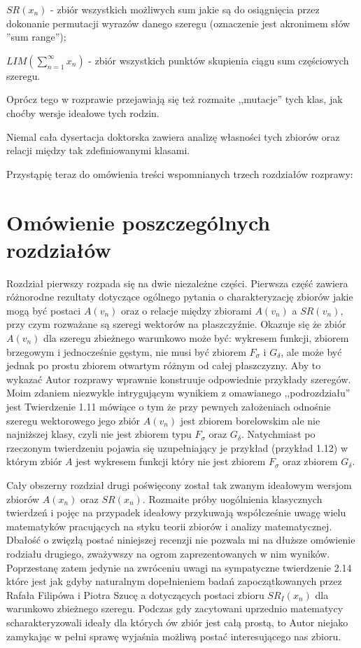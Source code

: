 \documentclass[12pt]{article}
\begin{document}
$SR(x_n)$ - zbiór wszystkich możliwych sum jakie są
do osiągnięcia przez dokonanie permutacji wyrazów
danego szeregu (oznaczenie jest akronimem słów 
''sum range'');

$LIM(\sum_{n=1}^\infty x_n)$ - zbiór wszystkich punktów
skupienia ciągu sum częściowych szeregu.

  Oprócz tego w rozprawie przejawiają się też rozmaite ,,mutacje''
tych klas, jak choćby wersje ideałowe tych rodzin.
  
  Niemal cała dysertacja doktorska zawiera analizę
własności tych zbiorów oraz relacji między tak zdefiniowanymi
klasami.
  

  Przystąpię teraz do omówienia treści wspomnianych trzech rozdziałów rozprawy:

\section{Omówienie poszczególnych rozdziałów}

Rozdział pierwszy rozpada się na dwie niezależne części.
Pierwsza część zawiera różnorodne rezultaty dotyczące ogólnego
pytania o charakteryzację zbiorów jakie mogą być postaci $A(v_n)$
oraz o relacje między zbiorami $A(v_n)$ a $SR(v_n)$, przy czym
rozważane są szeregi wektorów na płaszczyźnie.
Okazuje się że zbiór $A(v_n)$ dla szeregu zbieżnego warunkowo 
może być: wykresem funkcji,
zbiorem brzegowym i jednocześnie gęstym, nie musi być zbiorem
$F_\sigma$ i $G_\delta$, ale może być jednak po prostu zbiorem
otwartym różnym od całej płaszczyzny. Aby to wykazać Autor rozprawy 
wprawnie konstruuje odpowiednie przykłady szeregów. Moim zdaniem niezwykle
intrygującym wynikiem z omawianego ,,podrozdziału'' jest Twierdzenie
1.11 mówiące o tym że przy pewnych założeniach odnośnie szeregu
wektorowego jego zbiór $A(v_n)$ jest zbiorem borelowskim ale
nie najniższej klasy, czyli nie jest zbiorem typu $F_\sigma$ oraz
$G_\delta$. Natychmiast po rzeczonym twierdzeniu pojawia się uzupełniający
je przykład (przykład 1.12) w którym zbiór $A$ jest wykresem funkcji 
który nie jest zbiorem $F_\sigma$ oraz zbiorem $G_\delta$. 
    
  Cały obszerny rozdział drugi poświęcony został 
tak zwanym ideałowym wersjom zbiorów $A(x_n)$ oraz
$SR(x_n)$. Rozmaite próby uogólnienia klasycznych twierdzeń
i pojęc na przypadek ideałowy przykuwają współcześnie
uwagę wielu matematyków pracujących na styku teorii zbiorów 
i analizy matematycznej. Dbałość o zwięzłą postać niniejszej
recenzji nie pozwala mi na dłuższe omówienie rodziału drugiego,
zważywszy na ogrom zaprezentowanych w nim wyników. Poprzestanę zatem
jedynie na zwróceniu uwagi na sympatyczne twierdzenie 2.14 które 
jest jak gdyby naturalnym dopełnieniem badań zapoczątkowanych
przez Rafała Filipówa i Piotra Szucę a dotyczących 
postaci zbioru $SR_I(x_n)$ dla warunkowo zbieżnego szeregu.
Podczas gdy zacytowani uprzednio matematycy scharakteryzowali
ideały dla których ów zbiór jest całą prostą, to
Autor niejako zamykając w pełni sprawę wyjaśnia możliwą
postać interesującego nas zbioru.
  
\end{document}
